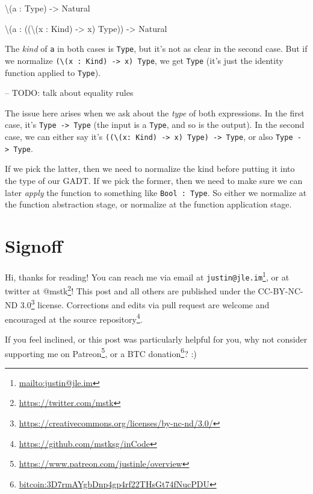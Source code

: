\documentclass[]{article}
\newenvironment{Shaded}{}{}
\newcommand{\DataTypeTok}[1]{\textcolor[rgb]{0.56,0.13,0.00}{#1}}
\newcommand{\NormalTok}[1]{#1}
\newcommand{\OperatorTok}[1]{\textcolor[rgb]{0.40,0.40,0.40}{#1}}
\newcommand{\OtherTok}[1]{\textcolor[rgb]{0.00,0.44,0.13}{#1}}
\renewcommand{\href}[2]{#2\footnote{\url{#1}}}
\begin{document}
\begin{Shaded}
\begin{Highlighting}[]
\NormalTok{\textbackslash{}(a }\OperatorTok{:} \DataTypeTok{Type}\NormalTok{) }\OtherTok{{-}\textgreater{}} \DataTypeTok{Natural}

\NormalTok{\textbackslash{}(a }\OperatorTok{:}\NormalTok{ ((\textbackslash{}(x }\OperatorTok{:} \DataTypeTok{Kind}\NormalTok{) }\OtherTok{{-}\textgreater{}}\NormalTok{ x) }\DataTypeTok{Type}\NormalTok{)) }\OtherTok{{-}\textgreater{}} \DataTypeTok{Natural}
\end{Highlighting}
\end{Shaded}

The \emph{kind} of \texttt{a} in both cases is \texttt{Type}, but it's not as
clear in the second case. But if we normalize
\texttt{(\textbackslash{}(x\ :\ Kind)\ -\textgreater{}\ x)\ Type}, we get
\texttt{Type} (it's just the identity function applied to \texttt{Type}).

-- TODO: talk about equality rules

The issue here arises when we ask about the \emph{type} of both expressions. In
the first case, it's \texttt{Type\ -\textgreater{}\ Type} (the input is a
\texttt{Type}, and so is the output). In the second case, we can either say it's
\texttt{((\textbackslash{}(x:\ Kind)\ -\textgreater{}\ x)\ Type)\ -\textgreater{}\ Type},
or also \texttt{Type\ -\textgreater{}\ Type}.

If we pick the latter, then we need to normalize the kind before putting it into
the type of our GADT. If we pick the former, then we need to make sure we can
later \emph{apply} the function to something like \texttt{Bool\ :\ Type}. So
either we normalize at the function abstraction stage, or normalize at the
function application stage.

\section{Signoff}\label{signoff}

Hi, thanks for reading! You can reach me via email at
\href{mailto:justin@jle.im}{\nolinkurl{justin@jle.im}}, or at twitter at
\href{https://twitter.com/mstk}{@mstk}! This post and all others are published
under the \href{https://creativecommons.org/licenses/by-nc-nd/3.0/}{CC-BY-NC-ND
3.0} license. Corrections and edits via pull request are welcome and encouraged
at \href{https://github.com/mstksg/inCode}{the source repository}.

If you feel inclined, or this post was particularly helpful for you, why not
consider \href{https://www.patreon.com/justinle/overview}{supporting me on
Patreon}, or a \href{bitcoin:3D7rmAYgbDnp4gp4rf22THsGt74fNucPDU}{BTC donation}?
:)
\end{document}
